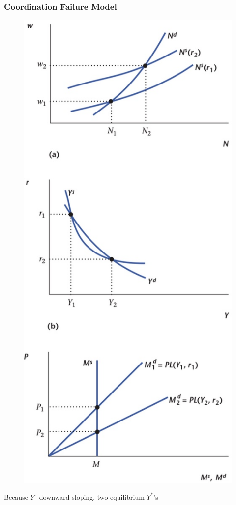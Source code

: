 \documentclass{beamer}
\begin{document}
\begin{frame}
\frametitle[alignment=center]{Coordination Failure Model}
\begin{figure}
\centering
\includegraphics[scale=0.18]{Figures/W_Fig_13pt9.png}
\end{figure}
Because $Y^s$ downward sloping, two equilibrium $Y^*$'s
\end{frame}
\end{document}
